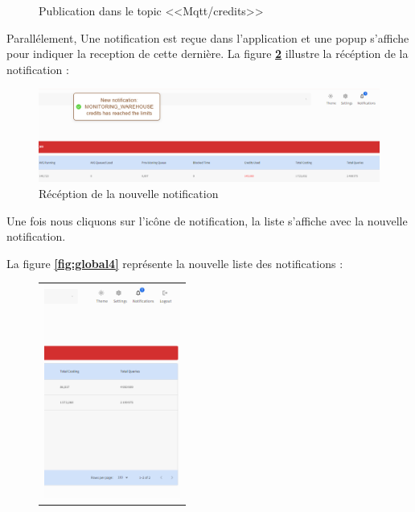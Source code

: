 \begin{itemize}
\begin{figure}[H]
        \caption{Publication dans le topic <<Mqtt/credits>>}
        \label{fig:global2}
    \end{figure}
    \par Parallélement, Une notification est reçue dans l'application et une popup s'affiche pour indiquer la reception de cette dernière. La figure \textbf{\ref{fig:global3}} illustre la récéption de la notification :
    \begin{figure}[H]
        \centering
        \includegraphics[width =1\linewidth]{img/captures/notifications/newglobal.png}
        \caption{Récéption de la nouvelle notification}
        \label{fig:global3}
    \end{figure}
    \par Une fois nous cliquons sur l'icône de notification, la liste s'affiche avec la nouvelle notification.
    \par La figure \textbf{\ref{fig:global4}} représente la nouvelle liste des notifications :
    \begin{figure}[H]
        \centering
        \begin{tabular}[b]{c}
        \includegraphics[width=0.3\linewidth ,height=7cm]{img/captures/notifications/newLimit.png} \\
        

\end{tabular}
\end{figure}
\end{itemize}
